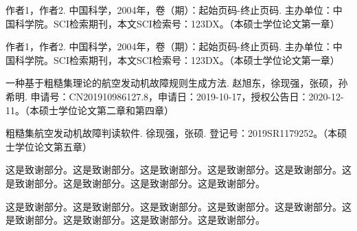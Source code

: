 \documentclass[ecopy,academic]{Style/dutthesis}
\begin{document}
\BIB  %


\begin{Publications}  %
    \begin{pubs}
        \item 作者1，作者2. 中国科学，2004年，卷（期）：起始页码-终止页码. 主办单位：中国科学院。SCI检索期刊，本文SCI检索号：123DX。（本硕士学位论文第一章）
        \item 作者1，作者2. 中国科学，2004年，卷（期）：起始页码-终止页码. 主办单位：中国科学院。SCI检索期刊，本文SCI检索号：123DX。（本硕士学位论文第一章）
        \item 一种基于粗糙集理论的航空发动机故障规则生成方法. 赵旭东，徐现强，张硕，孙希明. 申请号：CN201910986127.8，申请日：2019-10-17，授权公告日：2020-12-11。（本硕士学位论文第二章和第四章）
        \item 粗糙集航空发动机故障判读软件. 徐现强，张硕. 登记号：2019SR1179252。（本硕士学位论文第五章）
    \end{pubs}
\end{Publications}

\begin{Acknowledgement}  %
    这是致谢部分。这是致谢部分。这是致谢部分。这是致谢部分。这是致谢部分。这是致谢部分。这是致谢部分。这是致谢部分。这是致谢部分。

    这是致谢部分。这是致谢部分。这是致谢部分。这是致谢部分。这是致谢部分。这是致谢部分。这是致谢部分。这是致谢部分。这是致谢部分。
\end{Acknowledgement}

\AUTH  %
\end{document}
